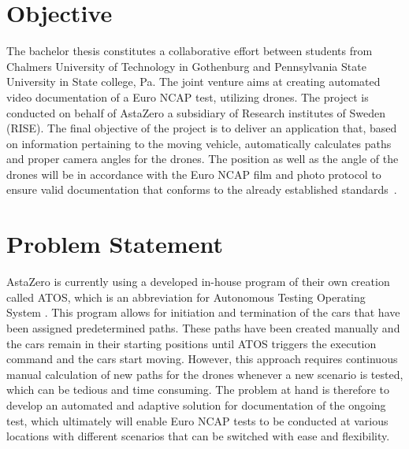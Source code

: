 \section{Objective} \label{Objective}

The bachelor thesis constitutes a collaborative effort between students from Chalmers University of Technology in Gothenburg and Pennsylvania State University in State college, Pa. The joint venture aims at creating automated video documentation of a Euro NCAP test, utilizing drones. The project is conducted on behalf of AstaZero a subsidiary of Research institutes of Sweden (RISE). The final objective of the project is to deliver an application that, based on information pertaining to the moving vehicle, automatically calculates paths and proper camera angles for the drones. The position as well as the angle of the drones will be in accordance with the Euro NCAP film and photo protocol to ensure valid documentation that conforms to the already established standards~\cite{EuroNCAP2021EUROPEANPROTOCOL}.
\bigskip
\newline 

\section{Problem Statement} \label{chap:problem statement}

AstaZero is currently using a developed in-house program of their own creation called ATOS, which is an abbreviation  for Autonomous Testing Operating System \cite{AstaZero2023ATOS:Systems.}. This program allows for initiation and termination of the cars that have been assigned predetermined paths. These paths have been created manually and the cars remain in their starting positions until ATOS triggers the execution command and the cars start moving. However, this approach requires continuous manual calculation of new paths for the drones whenever a new scenario is tested, which can be tedious and time consuming. The problem at hand is therefore to develop an automated and adaptive solution for %
documentation of the ongoing test,
which ultimately will enable Euro NCAP tests to be conducted at various locations with different scenarios that can be switched with ease and flexibility.
\bigskip
\newline

